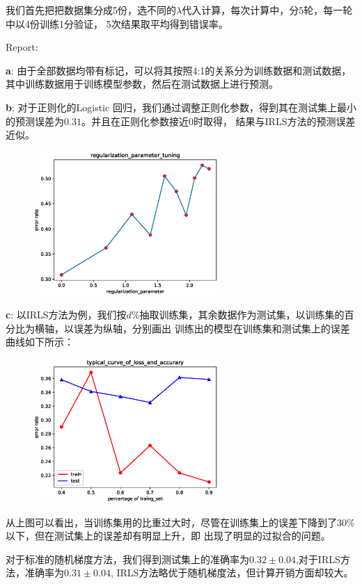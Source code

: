\documentclass{article}
\begin{document}
我们首先把把数据集分成5份，选不同的$\lambda$代入计算，每次计算中，分5轮，每一轮中以4份训练1分验证，
5次结果取平均得到错误率。

Report:

\textbf{a}:
由于全部数据均带有标记，可以将其按照4:1的关系分为训练数据和测试数据，
其中训练数据用于训练模型参数，然后在测试数据上进行预测。

\textbf{b}:
对于正则化的Logistic 回归，我们通过调整正则化参数，得到其在测试集上最小的预测误差为$0.31$。并且在正则化参数接近0时取得，
结果与IRLS方法的预测误差近似。
\begin{figure}[!ht]
\centering
\includegraphics[width=7cm]{logistic_regression_regularization_parameter_tuning.eps}
\end{figure}

\textbf{c}:
以IRLS方法为例，我们按$d\%$抽取训练集，其余数据作为测试集，以训练集的百分比为横轴，以误差为纵轴，分别画出
训练出的模型在训练集和测试集上的误差曲线如下所示：

\begin{figure}[!ht]
\centering
\includegraphics[width=7cm]{typical_curve_of_loss_and_accurary.eps}
\end{figure}

从上图可以看出，当训练集用的比重过大时，尽管在训练集上的误差下降到了30\%以下，但在测试集上的误差却有明显上升，即
出现了明显的过拟合的问题。

对于标准的随机梯度方法，我们得到测试集上的准确率为$0.32\pm 0.04$,对于IRLS方法，准确率为$0.31\pm 0.04$,
IRLS方法略优于随机梯度法，但计算开销方面却较大。
\end{document}
